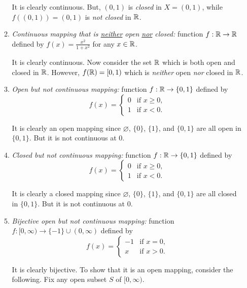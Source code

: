 \begin{enumerate}
\begin{enumerate}
\begin{pf}
It is clearly continuous. But, \((0,1)\) is \emph{closed} in
\(X=(0,1)\), while \(f((0,1))=(0,1)\) is \emph{not closed} in \(\mathbb{R}\).
\end{pf}

\item \emph{Continuous mapping that is \underline{neither} open \underline{nor}
closed:} function \(f:\mathbb{R}\to\mathbb{R}\) defined by \(\displaystyle f(x)=\frac{x^2}{1+x^2}\) for any
\(x\in\mathbb{R}\).

\begin{pf}
It is clearly continuous. Now consider the set \(\mathbb{R}\) which is both open and
closed in \(\mathbb{R}\). However, \(f(\mathbb{R})=[0,1)\) which is \emph{neither} open
\emph{nor} closed in \(\mathbb{R}\).
\end{pf}

\item \emph{Open but not continuous mapping:} function \(f:\mathbb{R}\to\{0,1\}\) defined by
\[
f(x)=\begin{cases}
0&\text{if \(x\ge 0\)},\\
1&\text{if \(x<0\)}.
\end{cases}
\]
\begin{pf}
It is clearly an open mapping since \(\varnothing\), \(\{0\}\), \(\{1\}\), and
\(\{0,1\}\) are all open in \(\{0,1\}\).  But it is not continuous at \(0\).
\end{pf}

\item \emph{Closed but not continuous mapping:} function \(f:\mathbb{R}\to\{0,1\}\) defined by
\[
f(x)=\begin{cases}
0&\text{if \(x\ge 0\)},\\
1&\text{if \(x<0\)}.
\end{cases}
\]
\begin{pf}
It is clearly a closed mapping since \(\varnothing\), \(\{0\}\), \(\{1\}\), and
\(\{0,1\}\) are all closed in \(\{0,1\}\).  But it is not continuous at \(0\).
\end{pf}

\item \emph{Bijective open but not continuous mapping:} function
\(f:[0,\infty)\to\{-1\}\cup(0,\infty)\) defined by
\[
f(x)=\begin{cases}
-1&\text{if \(x=0\)},\\
x&\text{if \(x>0\)}.
\end{cases}
\]
\begin{pf}
It is clearly bijective. To show that it is an open mapping, consider the
following. Fix any open subset \(S\) of \([0,\infty)\).


\end{pf}
\end{enumerate}
\end{enumerate}
